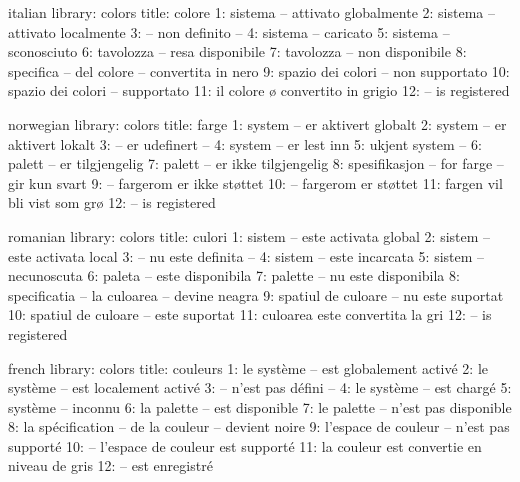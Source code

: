 \startmessages  italian  library: colors
  title: colore
      1: sistema -- attivato globalmente
      2: sistema -- attivato localmente
      3: -- non definito --
      4: sistema -- caricato
      5: sistema -- sconosciuto
      6: tavolozza -- resa disponibile
      7: tavolozza -- non disponibile
      8: specifica -- del colore -- convertita in nero
      9: spazio dei colori -- non supportato
     10: spazio dei colori -- supportato
     11: il colore ø convertito in grigio
     12: -- is registered
\stopmessages

\startmessages  norwegian  library: colors
  title: farge
      1: system -- er aktivert globalt
      2: system -- er aktivert lokalt
      3: -- er udefinert --
      4: system -- er lest inn
      5: ukjent system --
      6: palett -- er tilgjengelig
      7: palett -- er ikke tilgjengelig
      8: spesifikasjon -- for farge -- gir kun svart
      9: -- fargerom er ikke støttet
     10: -- fargerom er støttet
     11: fargen vil bli vist som grø
     12: -- is registered
\stopmessages

\startmessages  romanian  library: colors
  title: culori
      1: sistem -- este activata global
      2: sistem -- este activata local
      3: -- nu este definita --
      4: sistem -- este incarcata
      5: sistem -- necunoscuta
      6: paleta -- este disponibila
      7: palette -- nu este disponibila
      8: specificatia -- la culoarea -- devine neagra
      9: spatiul de culoare -- nu este suportat
     10: spatiul de culoare -- este suportat
     11: culoarea este convertita la gri
     12: -- is registered
\stopmessages

\startmessages  french  library: colors
  title: couleurs
      1: le système -- est globalement activé
      2: le système -- est localement activé
      3: -- n'est pas défini --
      4: le système -- est chargé
      5: système -- inconnu
      6: la palette -- est disponible
      7: le palette -- n'est pas disponible
      8: la spécification -- de la couleur -- devient noire
      9: l'espace de couleur -- n'est pas supporté
     10: -- l'espace de couleur est supporté
     11: la couleur est convertie en niveau de gris
     12: -- est enregistré
\stopmessages

\unprotect

\chardef{} %



